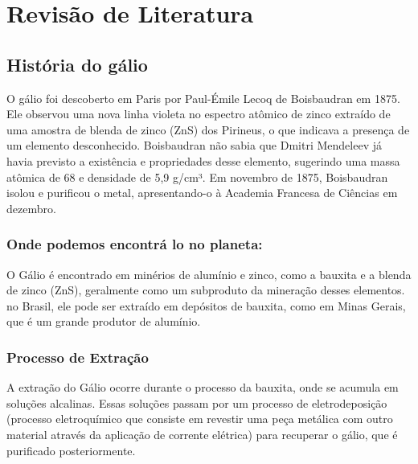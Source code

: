 \documentclass[12pt]{article}
\begin{document}
\section{Revisão de Literatura}
\subsection{História do gálio}
O gálio foi descoberto em Paris por Paul-Émile Lecoq de Boisbaudran em 1875. Ele observou uma nova linha violeta no espectro atômico de zinco extraído de uma amostra de blenda de zinco (ZnS) dos Pirineus, o que indicava a presença de um elemento desconhecido.
Boisbaudran não sabia que Dmitri Mendeleev já havia previsto a existência e propriedades desse elemento, sugerindo uma massa atômica de 68 e densidade de 5,9 g/cm³. Em novembro de 1875, Boisbaudran isolou e purificou o metal, apresentando-o à Academia Francesa de Ciências em dezembro.
\subsubsection{Onde podemos encontrá lo no planeta:}
O Gálio é encontrado em minérios de alumínio e zinco, como a bauxita e a blenda de zinco (ZnS), geralmente como um subproduto da mineração desses elementos. no Brasil, ele pode ser extraído em depósitos de bauxita, como em Minas Gerais, que é um grande produtor de alumínio.
\subsubsection{Processo de Extração}
A extração do Gálio ocorre durante o processo da bauxita, onde se acumula em soluções alcalinas. Essas soluções passam por um processo de eletrodeposição (processo eletroquímico que consiste em revestir uma peça metálica com outro material através da aplicação de corrente elétrica) para recuperar o gálio, que é purificado posteriormente. 
\end{document}
